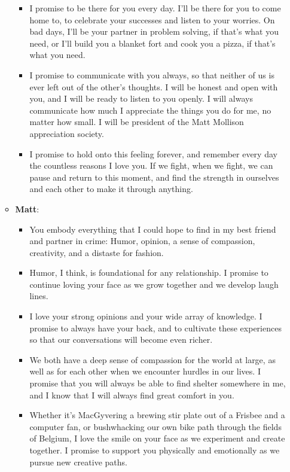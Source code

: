 \documentclass[12pt]{article}
\begin{document}
\begin{enumerate}
\begin{itemize}
\begin{itemize}
    \item I promise to be there for you every day. I'll be there for you to come home to, to celebrate your successes and listen to your worries. On bad days, I'll be your partner in problem solving, if that's what you need, or I'll build you a blanket fort and cook you a pizza, if that's what you need. 

    \item I promise to communicate with you always, so that neither of us is ever left out of the other's thoughts. I will be honest and open with you, and I will be ready to listen to you openly. I will always communicate how much I appreciate the things you do for me, no matter how small. I will be president of the Matt Mollison appreciation society.

    \item I promise to hold onto this feeling forever, and remember every day the countless reasons I love you. If we fight, when we fight, we can pause and return to this moment, and find the strength in ourselves and each other to make it through anything.
\end{itemize}


  \item {\bf Matt}:
    \begin{itemize}
    \item You embody everything that I could hope to find in my best friend and partner in crime: Humor, opinion, a sense of compassion, creativity, and a distaste for fashion.

    \item Humor, I think, is foundational for any relationship. I promise to continue loving your face as we grow together and we develop laugh lines.

    \item I love your strong opinions and your wide array of knowledge. I promise to always have your back, and to cultivate these experiences so that our conversations will become even richer.

    \item We both have a deep sense of compassion for the world at large, as well as for each other when we encounter hurdles in our lives. I promise that you will always be able to find shelter somewhere in me, and I know that I will always find great comfort in you.

    \item Whether it's MacGyvering a brewing stir plate out of a Frisbee and a computer fan, or bushwhacking our own bike path through the fields of Belgium, I love the smile on your face as we experiment and create together. I promise to support you physically and emotionally as we pursue new creative paths.


\end{itemize}
\end{itemize}
\end{enumerate}
\end{document}
